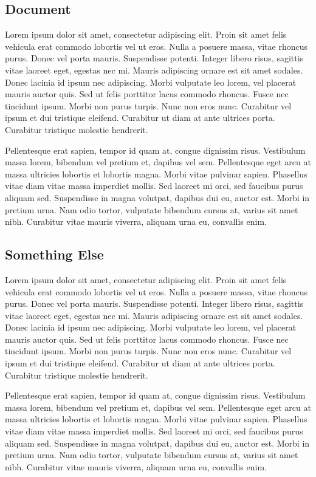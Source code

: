 \documentclass{vitmsprojectreport}
\begin{document}
\subsection{Document}

Lorem ipsum dolor sit amet, consectetur adipiscing elit. Proin sit amet felis vehicula erat commodo lobortis vel ut eros. Nulla a posuere massa, vitae rhoncus purus. Donec vel porta mauris. Suspendisse potenti. Integer libero risus, sagittis vitae laoreet eget, egestas nec mi. Mauris adipiscing ornare est sit amet sodales. Donec lacinia id ipsum nec adipiscing. Morbi vulputate leo lorem, vel placerat mauris auctor quis. Sed ut felis porttitor lacus commodo rhoncus. Fusce nec tincidunt ipsum. Morbi non purus turpis. Nunc non eros nunc. Curabitur vel ipsum et dui tristique eleifend. Curabitur ut diam at ante ultrices porta. Curabitur tristique molestie hendrerit.

Pellentesque erat sapien, tempor id quam at, congue dignissim risus. Vestibulum massa lorem, bibendum vel pretium et, dapibus vel sem. Pellentesque eget arcu at massa ultricies lobortis et lobortis magna. Morbi vitae pulvinar sapien. Phasellus vitae diam vitae massa imperdiet mollis. Sed laoreet mi orci, sed faucibus purus aliquam sed. Suspendisse in magna volutpat, dapibus dui eu, auctor est. Morbi in pretium urna. Nam odio tortor, vulputate bibendum cursus at, varius sit amet nibh. Curabitur vitae mauris viverra, aliquam urna eu, convallis enim.

\subsection{Something Else}

Lorem ipsum dolor sit amet, consectetur adipiscing elit. Proin sit amet felis vehicula erat commodo lobortis vel ut eros. Nulla a posuere massa, vitae rhoncus purus. Donec vel porta mauris. Suspendisse potenti. Integer libero risus, sagittis vitae laoreet eget, egestas nec mi. Mauris adipiscing ornare est sit amet sodales. Donec lacinia id ipsum nec adipiscing. Morbi vulputate leo lorem, vel placerat mauris auctor quis. Sed ut felis porttitor lacus commodo rhoncus. Fusce nec tincidunt ipsum. Morbi non purus turpis. Nunc non eros nunc. Curabitur vel ipsum et dui tristique eleifend. Curabitur ut diam at ante ultrices porta. Curabitur tristique molestie hendrerit.

Pellentesque erat sapien, tempor id quam at, congue dignissim risus. Vestibulum massa lorem, bibendum vel pretium et, dapibus vel sem. Pellentesque eget arcu at massa ultricies lobortis et lobortis magna. Morbi vitae pulvinar sapien. Phasellus vitae diam vitae massa imperdiet mollis. Sed laoreet mi orci, sed faucibus purus aliquam sed. Suspendisse in magna volutpat, dapibus dui eu, auctor est. Morbi in pretium urna. Nam odio tortor, vulputate bibendum cursus at, varius sit amet nibh. Curabitur vitae mauris viverra, aliquam urna eu, convallis enim.
\end{document}
